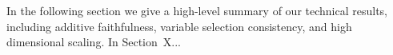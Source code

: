 %
%

In the following section we give a high-level summary of our technical
results, including additive faithfulness, variable selection 
consistency, and high dimensional scaling.  In Section~X...




